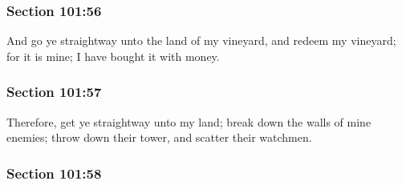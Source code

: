 
	\subsubsection{Section 101:56} %
		\label{DC101-56}

		And go ye straightway unto the land of my vineyard, and redeem my vineyard; for it is mine; I have bought it with money.


	\subsubsection{Section 101:57} %
		\label{DC101-57}

		Therefore, get ye straightway unto my land; break down the walls of mine enemies; throw down their tower, and scatter their watchmen.


	\subsubsection{Section 101:58} %
		\label{DC101-58}

